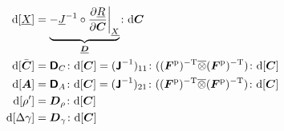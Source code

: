 \documentclass[a4paper,11pt]{article}
\newcommand{\ootimes}{\overline{\otimes}}
\newcommand{\tf}[1]{\text{\boldmath $\sf #1$}}
\newcommand{\ts}[1]{\text{\boldmath $#1$}}
\newcommand{\pderiv}[2]{\frac{\partial #1}{\partial #2}}
\newcommand{\dev}{{\rm dev}}
\newcommand{\rmd}{{\rm d}}
\newcommand{\rmm}{{\rm m}}
\newcommand{\rmp}{{\rm p}}
\newcommand{\rmT}{{\rm T}}
\begin{document}
\begin{align*}
	\rmd[\underline X] &= \underbrace{-\underline J^{-1}\circ\pderiv{\underline R}{\ts C}\bigg|_{\underline X}}_{\underline{\ts D}}\colon\rmd\ts C\\
	\rmd[\bar{\ts C}]  &= \tf D_C \colon\rmd[\ts C] = (\tf J^{-1})_{11}\colon((\ts F^\rmp)^{-\rmT}\ootimes(\ts F^\rmp)^{-\rmT})\colon\rmd[\ts C]\\
	\rmd[\ts A]        &= \tf D_A \colon\rmd[\ts C] = (\tf J^{-1})_{21}\colon((\ts F^\rmp)^{-\rmT}\ootimes(\ts F^\rmp)^{-\rmT})\colon\rmd[\ts C]\\
	\rmd[\rho']        &= \ts D_\rho \colon\rmd[\ts C]\\
	\rmd[\Delta\gamma] &= \ts D_\gamma \colon\rmd[\ts C]
\end{align*}

\end{document}
